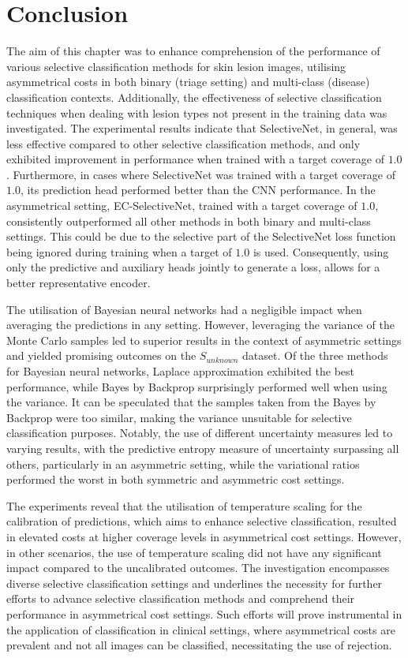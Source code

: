 \section{Conclusion}
\label{sec:selective_conclusion}
The aim of this chapter was to enhance comprehension of the performance of various selective classification methods for skin lesion images, utilising asymmetrical costs in both binary (triage setting) and multi-class (disease) classification contexts. Additionally, the effectiveness of selective classification techniques when dealing with lesion types not present in the training data was investigated. The experimental results indicate that SelectiveNet, in general, was less effective compared to other selective classification methods, and only exhibited improvement in performance when trained with a target coverage of $1.0$. Furthermore, in cases where SelectiveNet was trained with a target coverage of $1.0$, its prediction head performed better than the CNN performance. In the asymmetrical setting, EC-SelectiveNet, trained with a target coverage of $1.0$, consistently outperformed all other methods in both binary and multi-class settings. This could be due to the selective part of the SelectiveNet loss function being ignored during training when a target of $1.0$ is used. Consequently, using only the predictive and auxiliary heads jointly to generate a loss, allows for a better representative encoder.

The utilisation of Bayesian neural networks had a negligible impact when averaging the predictions in any setting. However, leveraging the variance of the Monte Carlo samples led to superior results in the context of asymmetric settings and yielded promising outcomes on the $S_{unknown}$ dataset. Of the three methods for Bayesian neural networks, Laplace approximation exhibited the best performance, while Bayes by Backprop surprisingly performed well when using the variance. It can be speculated that the samples taken from the Bayes by Backprop were too similar, making the variance unsuitable for selective classification purposes. Notably, the use of different uncertainty measures led to varying results, with the predictive entropy measure of uncertainty surpassing all others, particularly in an asymmetric setting, while the variational ratios performed the worst in both symmetric and asymmetric cost settings.

The experiments reveal that the utilisation of temperature scaling for the calibration of predictions, which aims to enhance selective classification, resulted in elevated costs at higher coverage levels in asymmetrical cost settings. However, in other scenarios, the use of temperature scaling did not have any significant impact compared to the uncalibrated outcomes. The investigation encompasses diverse selective classification settings and underlines the necessity for further efforts to advance selective classification methods and comprehend their performance in asymmetrical cost settings. Such efforts will prove instrumental in the application of classification in clinical settings, where asymmetrical costs are prevalent and not all images can be classified, necessitating the use of rejection.


